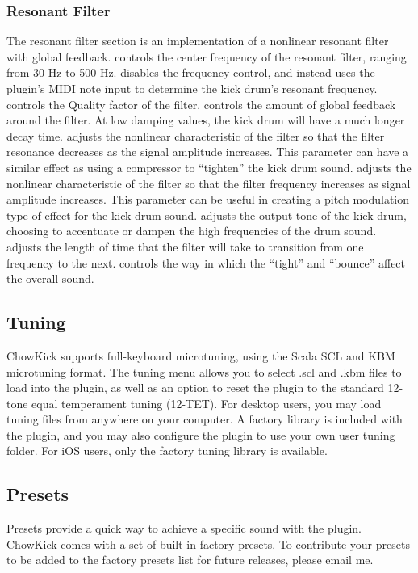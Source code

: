 \documentclass[landscape,twocolumn,a5paper]{manual}
\begin{document}
\subsubsection{Resonant Filter}
The resonant filter section is an implementation of a nonlinear
resonant filter with global feedback.
\newpar
{} controls the center frequency of the
resonant filter, ranging from 30 Hz to 500 Hz.
\newpar
{} disables the frequency control, and instead
uses the plugin's MIDI note input to determine the kick drum's
resonant frequency.
\newpar
{} controls the Quality factor of the filter.
\newpar
{} controls the amount of global feedback
around the filter. At low damping values, the kick drum
will have a much longer decay time.
\newpar
{} adjusts the nonlinear characteristic
of the filter so that the filter resonance decreases as
the signal amplitude increases. This parameter can have
a similar effect as using a compressor to ``tighten''
the kick drum sound.
\newpar
{} adjusts the nonlinear characteristic
of the filter so that the filter frequency increases as
signal amplitude increases. This parameter can be useful
in creating a pitch modulation type of effect for the kick
drum sound.
\newpar
{} adjusts the output tone of the kick drum,
choosing to accentuate or dampen the high frequencies of
the drum sound.
\newpar
{} adjusts the length of time that
the filter will take to transition from one frequency
to the next.
\newpar
{} controls the way in which the
``tight'' and ``bounce'' affect the overall sound.

\subsection{Tuning}
ChowKick supports full-keyboard microtuning, using the
Scala SCL and KBM microtuning format. The tuning menu
allows you to select .scl and .kbm files to load into
the plugin, as well as an option to reset the plugin
to the standard 12-tone equal temperament tuning (12-TET).
\newpar
For desktop users, you may load tuning files from anywhere
on your computer. A factory library is included with the
plugin, and you may also configure the plugin to use your
own user tuning folder. For iOS users, only the factory
tuning library is available.

\subsection{Presets}
Presets provide a quick way to achieve a specific sound
with the plugin. ChowKick comes with a set of built-in
factory presets. To contribute your presets to be added
to the factory presets list for future releases, please
email me.
\end{document}
